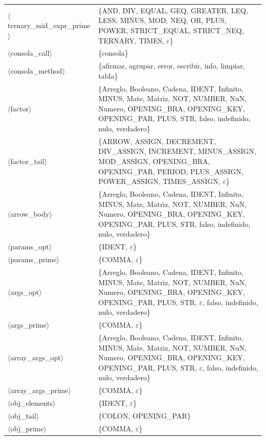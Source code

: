 \documentclass[10pt]{article}
\begin{document}
{\begin{longtable}{@{} p{3.5cm} p{13cm} @{}}
  \parbox[t]{3.3cm}{\raggedright$\langle$ternary\_\allowbreak{}mid\_\allowbreak{}expr\_\allowbreak{}prime$\rangle$} & \{AND, DIV, EQUAL, GEQ, GREATER, LEQ, LESS, MINUS, MOD, NEQ, OR, PLUS, POWER, STRICT\_EQUAL, STRICT\_NEQ, TERNARY, TIMES, $\varepsilon$\} \\
  \parbox[t]{3.3cm}{\raggedright$\langle$consola\_\allowbreak{}call$\rangle$} & \{consola\} \\
  \parbox[t]{3.3cm}{\raggedright$\langle$consola\_\allowbreak{}method$\rangle$} & \{afirmar, agrupar, error, escribir, info, limpiar, tabla\} \\
  \parbox[t]{3.3cm}{\raggedright$\langle$factor$\rangle$} & \{Arreglo, Booleano, Cadena, IDENT, Infinito, MINUS, Mate, Matriz, NOT, NUMBER, NuN, Numero, OPENING\_BRA, OPENING\_KEY, OPENING\_PAR, PLUS, STR, falso, indefinido, nulo, verdadero\} \\
  \parbox[t]{3.3cm}{\raggedright$\langle$factor\_\allowbreak{}tail$\rangle$} & \{ARROW, ASSIGN, DECREMENT, DIV\_ASSIGN, INCREMENT, MINUS\_ASSIGN, MOD\_ASSIGN, OPENING\_BRA, OPENING\_PAR, PERIOD, PLUS\_ASSIGN, POWER\_ASSIGN, TIMES\_ASSIGN, $\varepsilon$\} \\
  \parbox[t]{3.3cm}{\raggedright$\langle$arrow\_\allowbreak{}body$\rangle$} & \{Arreglo, Booleano, Cadena, IDENT, Infinito, MINUS, Mate, Matriz, NOT, NUMBER, NuN, Numero, OPENING\_BRA, OPENING\_KEY, OPENING\_PAR, PLUS, STR, falso, indefinido, nulo, verdadero\} \\
  \parbox[t]{3.3cm}{\raggedright$\langle$params\_\allowbreak{}opt$\rangle$} & \{IDENT, $\varepsilon$\} \\
  \parbox[t]{3.3cm}{\raggedright$\langle$params\_\allowbreak{}prime$\rangle$} & \{COMMA, $\varepsilon$\} \\
  \parbox[t]{3.3cm}{\raggedright$\langle$args\_\allowbreak{}opt$\rangle$} & \{Arreglo, Booleano, Cadena, IDENT, Infinito, MINUS, Mate, Matriz, NOT, NUMBER, NuN, Numero, OPENING\_BRA, OPENING\_KEY, OPENING\_PAR, PLUS, STR, $\varepsilon$, falso, indefinido, nulo, verdadero\} \\
  \parbox[t]{3.3cm}{\raggedright$\langle$args\_\allowbreak{}prime$\rangle$} & \{COMMA, $\varepsilon$\} \\
  \parbox[t]{3.3cm}{\raggedright$\langle$array\_\allowbreak{}args\_\allowbreak{}opt$\rangle$} & \{Arreglo, Booleano, Cadena, IDENT, Infinito, MINUS, Mate, Matriz, NOT, NUMBER, NuN, Numero, OPENING\_BRA, OPENING\_KEY, OPENING\_PAR, PLUS, STR, $\varepsilon$, falso, indefinido, nulo, verdadero\} \\
  \parbox[t]{3.3cm}{\raggedright$\langle$array\_\allowbreak{}args\_\allowbreak{}prime$\rangle$} & \{COMMA, $\varepsilon$\} \\
  \parbox[t]{3.3cm}{\raggedright$\langle$obj\_\allowbreak{}elements$\rangle$} & \{IDENT, $\varepsilon$\} \\
  \parbox[t]{3.3cm}{\raggedright$\langle$obj\_\allowbreak{}tail$\rangle$} & \{COLON, OPENING\_PAR\} \\
  \parbox[t]{3.3cm}{\raggedright$\langle$obj\_\allowbreak{}prime$\rangle$} & \{COMMA, $\varepsilon$\} \\
  \bottomrule
\end{longtable}
}
\end{document}
